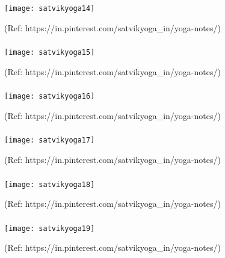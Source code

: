 \begin{frame}[fragile]\frametitle{}

\begin{center}
\texttt{[image: satvikyoga14]}

{\tiny (Ref: https://in.pinterest.com/satvikyoga\_in/yoga-notes/)}
\end{center}

\end{frame}

\begin{frame}[fragile]\frametitle{}

\begin{center}
\texttt{[image: satvikyoga15]}

{\tiny (Ref: https://in.pinterest.com/satvikyoga\_in/yoga-notes/)}
\end{center}

\end{frame}

\begin{frame}[fragile]\frametitle{}

\begin{center}
\texttt{[image: satvikyoga16]}

{\tiny (Ref: https://in.pinterest.com/satvikyoga\_in/yoga-notes/)}
\end{center}

\end{frame}

\begin{frame}[fragile]\frametitle{}

\begin{center}
\texttt{[image: satvikyoga17]}

{\tiny (Ref: https://in.pinterest.com/satvikyoga\_in/yoga-notes/)}
\end{center}

\end{frame}

\begin{frame}[fragile]\frametitle{}

\begin{center}
\texttt{[image: satvikyoga18]}

{\tiny (Ref: https://in.pinterest.com/satvikyoga\_in/yoga-notes/)}
\end{center}

\end{frame}

\begin{frame}[fragile]\frametitle{}

\begin{center}
\texttt{[image: satvikyoga19]}

{\tiny (Ref: https://in.pinterest.com/satvikyoga\_in/yoga-notes/)}
\end{center}

\end{frame}


